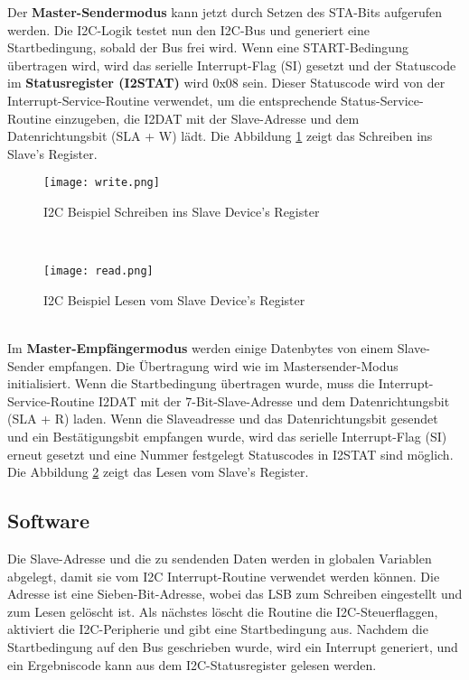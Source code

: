 Der \textbf{Master-Sendermodus} kann jetzt durch Setzen des STA-Bits aufgerufen werden. Die I2C-Logik testet nun den I2C-Bus und generiert eine Startbedingung, sobald der Bus frei wird. Wenn eine START-Bedingung übertragen wird, wird das serielle Interrupt-Flag (SI) gesetzt und der Statuscode im \textbf{Statusregister (I2STAT)} wird 0x08 sein. Dieser Statuscode wird von der Interrupt-Service-Routine verwendet, um die entsprechende Status-Service-Routine einzugeben, die I2DAT mit der Slave-Adresse und dem Datenrichtungsbit (SLA + W) lädt. Die Abbildung \ref{fig:write} zeigt das Schreiben ins Slave's Register.
\begin{figure}[!hb]
	\centering
	\texttt{[image: write.png]}
	\caption[I2C Beispiel Schreiben ins Slave Device's Register]{I2C Beispiel Schreiben ins Slave Device's Register}
	\label{fig:write}
\end{figure}\\
\begin{figure}[!hb]
	\centering
	\texttt{[image: read.png]}
	\caption[I2C Beispiel Lesen vom Slave Device's Register]{I2C Beispiel Lesen vom Slave Device's Register}
	\label{fig:read}
\end{figure}\\

Im \textbf{Master-Empfängermodus} werden einige Datenbytes von einem Slave-Sender empfangen. Die Übertragung wird wie im Mastersender-Modus initialisiert. Wenn die Startbedingung übertragen wurde, muss die Interrupt-Service-Routine I2DAT mit der 7-Bit-Slave-Adresse und dem Datenrichtungsbit (SLA + R) laden. Wenn die Slaveadresse und das Datenrichtungsbit gesendet und ein Bestätigungsbit empfangen wurde, wird das serielle Interrupt-Flag (SI) erneut gesetzt und eine Nummer festgelegt Statuscodes in I2STAT sind möglich. Die Abbildung \ref{fig:read} zeigt das Lesen vom Slave's Register.

\subsection{Software}
Die Slave-Adresse und die zu sendenden Daten werden in globalen Variablen abgelegt, damit sie vom I2C Interrupt-Routine verwendet werden können. Die Adresse ist eine Sieben-Bit-Adresse, wobei das LSB zum Schreiben eingestellt und zum Lesen gelöscht ist. Als nächstes löscht die Routine die I2C-Steuerflaggen, aktiviert die I2C-Peripherie und gibt eine Startbedingung aus. Nachdem die Startbedingung auf den Bus geschrieben wurde, wird ein Interrupt generiert, und ein Ergebniscode kann aus dem I2C-Statusregister gelesen werden.

